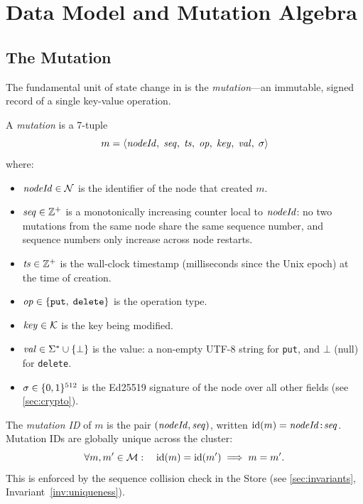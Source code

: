 \section{Data Model and Mutation Algebra}
\label{sec:datamodel}

\subsection{The Mutation}

The fundamental unit of state change in \pebble{} is the \emph{mutation}---an
immutable, signed record of a single key-value operation.

\begin{definition}[Mutation]
\label{def:mutation}
A \emph{mutation} is a 7-tuple
\[
  m = \langle \mathit{nodeId},\; \mathit{seq},\; \mathit{ts},\; \mathit{op},\; \mathit{key},\; \mathit{val},\; \sigma \rangle
\]
where:
\begin{itemize}[leftmargin=1.5em]
  \item $\mathit{nodeId} \in \mathcal{N}$ is the identifier of the node that created $m$.
  \item $\mathit{seq} \in \mathbb{Z}^{+}$ is a monotonically increasing counter local
        to $\mathit{nodeId}$: no two mutations from the same node share the same sequence
        number, and sequence numbers only increase across node restarts.
  \item $\mathit{ts} \in \mathbb{Z}^{+}$ is the wall-clock timestamp (milliseconds
        since the Unix epoch) at the time of creation.
  \item $\mathit{op} \in \{\texttt{put},\; \texttt{delete}\}$ is the operation type.
  \item $\mathit{key} \in \mathcal{K}$ is the key being modified.
  \item $\mathit{val} \in \Sigma^* \cup \{\bot\}$ is the value: a non-empty UTF-8
        string for \texttt{put}, and $\bot$ (null) for \texttt{delete}.
  \item $\sigma \in \{0,1\}^{512}$ is the Ed25519 signature of the node over
        all other fields (see \cref{sec:crypto}).
\end{itemize}
\end{definition}

\begin{definition}[Mutation ID]
\label{def:mutid}
The \emph{mutation ID} of $m$ is the pair $(\mathit{nodeId}, \mathit{seq})$, written
$\mathrm{id}(m) = \mathit{nodeId}\texttt{:}\mathit{seq}$.
Mutation IDs are globally unique across the cluster:
\[
  \forall m, m' \in \mathcal{M}:\quad
  \mathrm{id}(m) = \mathrm{id}(m') \implies m = m'.
\]
This is enforced by the sequence collision check in the Store
(see \cref{sec:invariants}, Invariant~\ref{inv:uniqueness}).
\end{definition}

